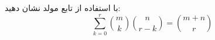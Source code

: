     \p 
با استفاده از تابع مولد نشان دهید:
$$\sum_{k=0}^{r}\binom{m}{k}\binom{n}{r - k} = \binom{m + n}{r}$$